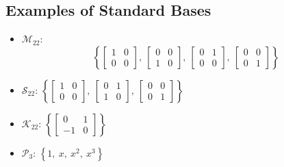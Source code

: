 \documentclass{article}
\begin{document}
\begin{multicols*}{3}
    \subsection{Examples of Standard Bases}
    \begin{itemize}
        \item \(\mathscr{M}_{22}\):
              \begin{equation*}
                  \left\{
                  \begin{bmatrix*}
                      1 & 0 \\
                      0 & 0
                  \end{bmatrix*}
                  ,\:
                  \begin{bmatrix*}
                      0 & 0 \\
                      1 & 0
                  \end{bmatrix*}
                  ,\:
                  \begin{bmatrix*}
                      0 & 1 \\
                      0 & 0
                  \end{bmatrix*}
                  ,\:
                  \begin{bmatrix*}
                      0 & 0 \\
                      0 & 1
                  \end{bmatrix*}
                  \right\}
              \end{equation*}
        \item \(\mathscr{S}_{22}\): \(\left\{
              \begin{bmatrix*}
                  1 & 0 \\
                  0 & 0
              \end{bmatrix*}
              ,\:
              \begin{bmatrix*}
                  0 & 1 \\
                  1 & 0
              \end{bmatrix*}
              ,\:
              \begin{bmatrix*}
                  0 & 0 \\
                  0 & 1
              \end{bmatrix*}
              \right\}\)
        \item \(\mathscr{K}_{22}\): \(\left\{
              \begin{bmatrix*}
                  0 & 1 \\
                  -1 & 0
              \end{bmatrix*}
              \right\}\)
        \item \(\mathscr{P}_3\): \(\left\{ 1,\: x,\: x^2,\: x^3 \right\}\)
    \end{itemize}

\end{multicols*}
\end{document}
